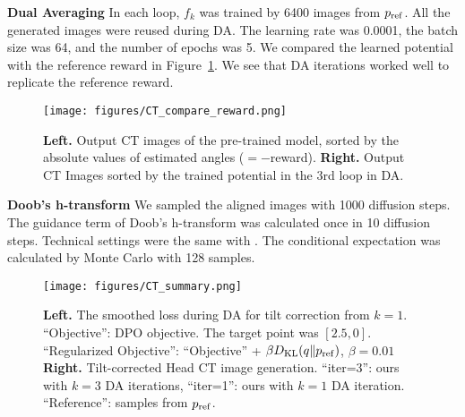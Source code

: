 \textbf{Dual Averaging}
In each loop, $f_k$ was trained by 6400 images from $p_{\rm{ref}}$. All the generated images were reused during DA. The learning rate was 0.0001, the batch size was 64, and the number of epochs was 5. We compared the learned potential with the reference reward in Figure~\ref{fig:CT-compare}. We see that DA iterations worked well to replicate the reference reward.

\begin{figure}[htbp]
   \centering
    \texttt{[image: figures/CT\_compare\_reward.png]}
    \caption{\textbf{Left.} Output CT images of the pre-trained model, sorted by the absolute values of estimated angles ($=-$reward). \textbf{Right.} Output CT Images sorted by the trained potential in the $3$rd loop in DA.}
    \label{fig:CT-compare}
\end{figure}

\textbf{Doob's h-transform}
We sampled the aligned images with 1000 diffusion steps. The guidance term of Doob's h-transform was calculated once in 10 diffusion steps. Technical settings were the same with . The conditional expectation was calculated by Monte Carlo with 128 samples. 

\begin{figure}[h]
    \centering
    \texttt{[image: figures/CT\_summary.png]}
    \caption{\textbf{Left. }The smoothed loss during DA for tilt correction from $k=1$. ``Objective'': DPO objective. The target point was $[2.5, 0]$.
        ``Regularized Objective'': ``Objective'' + $\beta D_{\mathrm{KL}}(q\|p_{\rm{ref}})$, $\beta=0.01$
    \textbf{Right.} Tilt-corrected Head CT image generation. ``iter=3'': ours with $k=3$ DA iterations, ``iter=1'': ours with $k=1$ DA iteration. ``Reference'': samples from $p_{\rm{ref}}$.}
    \label{fig:CT-summary}
\end{figure}
